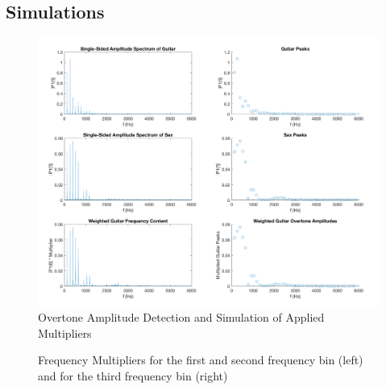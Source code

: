 \documentclass[12pt]{article}
\begin{document}
\subsection{Simulations}

\begin{figure}[H]
\includegraphics[scale=0.3]{Pictures/FreqPlot1.png}
\centering
\caption{Overtone Amplitude Detection and Simulation of Applied Multipliers}
\centering
\end{figure}

\begin{figure}[h]
\caption{Frequency Multipliers for the first and second frequency bin (left) and for the third frequency bin (right)}
\centering
\end{figure}
\end{document}
